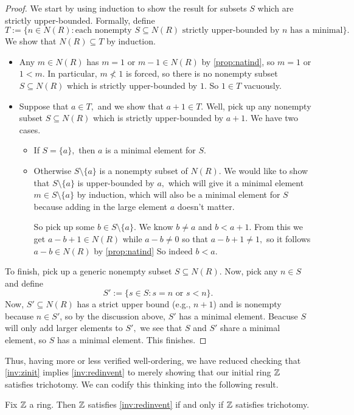 \documentclass{article}
\begin{document}
\begin{proof}
	We start by using induction to show the result for subsets $S$ which are strictly upper-bounded. Formally, define
	\[T:=\{n\in N(R):\text{each nonempty }S\subseteq N(R)\text{ strictly upper-bounded by }n\text{ has a minimal}\}.\]
	We show that $N(R)\subseteq T$ by induction.
	\begin{itemize}
		\item Any $m\in N(R)$ has $m=1$ or $m-1\in N(R)$ by \autoref{prop:natind}, so $m=1$ or $1<m.$ In particular, $m\not<1$ is forced, so there is no nonempty subset $S\subseteq N(R)$ which is strictly upper-bounded by $1.$ So $1\in T$ vacuously.
		\item Suppose that $a\in T,$ and we show that $a+1\in T.$ Well, pick up any nonempty subset $S\subseteq N(R)$ which is strictly upper-bounded by $a+1.$ We have two cases.
		\begin{itemize}
			\item If $S=\{a\},$ then $a$ is a minimal element for $S.$
			\item Otherwise $S\setminus\{a\}$ is a nonempty subset of $N(R).$ We would like to show that $S\setminus\{a\}$ is upper-bounded by $a,$ which will give it a minimal element $m\in S\setminus\{a\}$ by induction, which will also be a minimal element for $S$ because adding in the large element $a$ doesn't matter.

			So pick up some $b\in S\setminus\{a\}.$ We know $b\ne a$ and $b<a+1.$ From this we get $a-b+1\in N(R)$ while $a-b\ne0$ so that $a-b+1\ne1,$ so it follows $a-b\in N(R)$ by \autoref{prop:natind} So indeed $b<a.$
		\end{itemize}
	\end{itemize}
	To finish, pick up a generic nonempty subset $S\subseteq N(R).$ Now, pick any $n\in S$ and define
	\[S':=\{s\in S:s=n\text{ or }s<n\}.\]
	Now, $S'\subseteq N(R)$ has a strict upper bound (e.g., $n+1$) and is nonempty because $n\in S'$, so by the discussion above, $S'$ has a minimal element. Beacuse $S$ will only add larger elements to $S',$ we see that $S$ and $S'$ share a minimal element, so $S$ has a minimal element. This finishes.
\end{proof}
Thus, having more or less verified well-ordering, we have reduced checking that \autoref{inv:zinit} implies \autoref{inv:redinvent} to merely showing that our initial ring $\mathbb Z$ satisfies trichotomy. We can codify this thinking into the following result.
\begin{proposition} \label{prop:inv1istrich}
	Fix $\mathbb Z$ a ring. Then $\mathbb Z$ satisfies \autoref{inv:redinvent} if and only if $\mathbb Z$ satisfies trichotomy.
\end{proposition}
\end{document}
